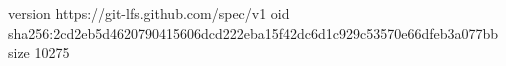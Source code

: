 version https://git-lfs.github.com/spec/v1
oid sha256:2cd2eb5d4620790415606dcd222eba15f42dc6d1c929c53570e66dfeb3a077bb
size 10275
